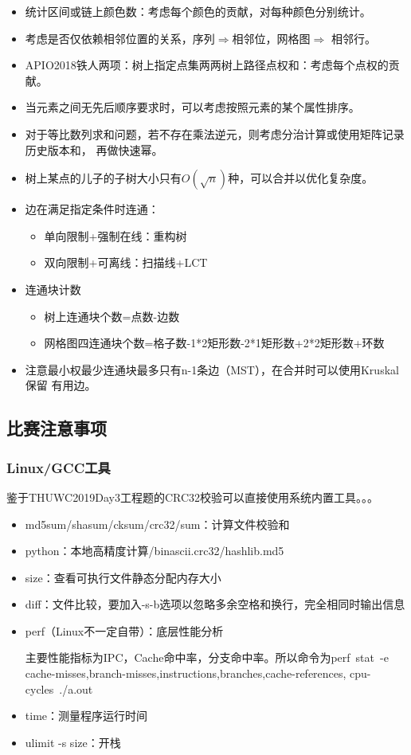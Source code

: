 \begin{itemize}
	\item 统计区间或链上颜色数：考虑每个颜色的贡献，对每种颜色分别统计。
	\item 考虑是否仅依赖相邻位置的关系，序列$\Rightarrow$相邻位，网格图$\Rightarrow$
	相邻行。
	\item APIO2018铁人两项：树上指定点集两两树上路径点权和：考虑每个点权的贡献。
	\item 当元素之间无先后顺序要求时，可以考虑按照元素的某个属性排序。
	\item 对于等比数列求和问题，若不存在乘法逆元，则考虑分治计算或使用矩阵记录历史版本和，
	再做快速幂。
	\item 树上某点的儿子的子树大小只有$O(\sqrt{n})$种，可以合并以优化复杂度。
	\item 边在满足指定条件时连通：
	\begin{itemize}
		\item 单向限制+强制在线：重构树
		\item 双向限制+可离线：扫描线+LCT
	\end{itemize}
	\item 连通块计数
	\begin{itemize}
		\item 树上连通块个数=点数-边数
		\item 网格图四连通块个数=格子数-1*2矩形数-2*1矩形数+2*2矩形数+环数
	\end{itemize}
	\item 注意最小权最少连通块最多只有n-1条边（MST），在合并时可以使用Kruskal保留
	有用边。
\end{itemize}
\subsection{比赛注意事项}
\subsubsection{Linux/GCC工具}
鉴于THUWC2019Day3工程题的CRC32校验可以直接使用系统内置工具。。。
\begin{itemize}
	\item md5sum/shasum/cksum/crc32/sum：计算文件校验和
	\item python：本地高精度计算/binascii.crc32/hashlib.md5
	\item size：查看可执行文件静态分配内存大小
	\item diff：文件比较，要加入-s-b选项以忽略多余空格和换行，完全相同时输出信息
	\item perf（Linux不一定自带）：底层性能分析

	主要性能指标为IPC，Cache命中率，分支命中率。所以命令为perf~stat~-e~
	cache-misses,branch-misses,instructions,branches,cache-references,
	cpu-cycles~./a.out
	\item time：测量程序运行时间
	\item ulimit -s size：开栈
\end{itemize}
